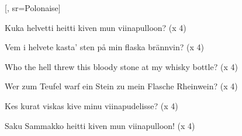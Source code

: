 [,
		sr={Polonaise}]

\beginverse
Kuka helvetti heitti kiven mun
viinapulloon? (x 4)
\endverse

\beginverse
Vem i helvete kasta' sten på min
flaska brännvin? (x 4)
\endverse

\beginverse
Who the hell threw this bloody stone at my
whisky bottle? (x 4)
\endverse

\beginverse
Wer zum Teufel warf ein Stein zu mein
Flasche Rheinwein? (x 4)
\endverse

\beginverse
Kes kurat viskas kive minu
viinapudelisse? (x 4)
\endverse

\beginverse
Saku Sammakko heitti kiven mun
viinapulloon! (x 4)
\endverse
\endsong